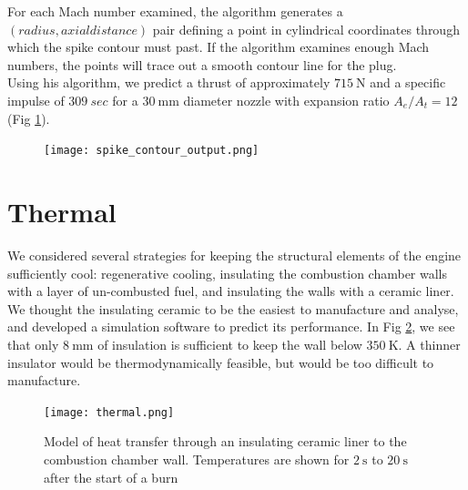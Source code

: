 \documentclass{article}
\begin{document}
For each Mach number examined, the algorithm generates a $(radius, axial distance)$ pair defining a point in cylindrical coordinates through which the spike contour must past. If the algorithm examines enough Mach numbers, the points will trace out a smooth contour line for the plug.\\
Using his algorithm, we predict a thrust of approximately $\SI{715}{\newton}$ and a specific impulse of $\SI{309}{sec}$ for a $\SI{30}{\milli\metre}$ diameter nozzle with expansion ratio $A_e/A_t = 12$ (Fig \ref{spike_contour}).
\begin{figure}[h!]
\centering
\texttt{[image: spike\_contour\_output.png]}
\label{spike_contour}
\end{figure}

\section*{Thermal}
We considered several strategies for keeping the structural elements of the engine sufficiently cool: regenerative cooling, insulating the combustion chamber walls with a layer of un-combusted fuel, and insulating the walls with a ceramic liner. We thought the insulating ceramic to be the easiest to manufacture and analyse, and developed a simulation software to predict its performance. In Fig \ref{thermal}, we see that only $\SI{8}{\milli\metre}$ of insulation is sufficient to keep the wall below $\SI{350}{\kelvin}$. A thinner insulator would be thermodynamically feasible, but would be too difficult to manufacture.
\begin{figure}[h!]
\centering
\texttt{[image: thermal.png]}
\caption{Model of heat transfer through an insulating ceramic liner to the combustion chamber wall. Temperatures are shown for $\SI{2}{\second}$ to $\SI{20}{\second}$ after the start of a burn} 
\label{thermal}
\end{figure}
\end{document}
